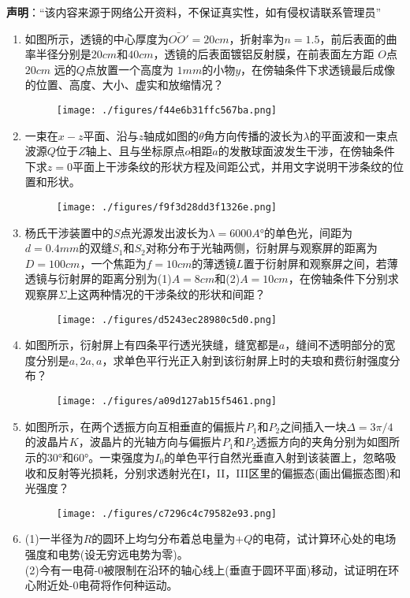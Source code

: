 

\textbf{声明}：“该内容来源于网络公开资料，不保证真实性，如有侵权请联系管理员”
\begin{enumerate}
\item 如图所示，透镜的中心厚度为$\bar{OO'}=20cm$，折射率为$n=1.5$，前后表面的曲率半径分别是$20cm$和$40cm$，透镜的后表面镀铝反射膜，在前表面左方距 $O$点 $20cm$ 远的$Q$点放置一个高度为 $1mm $的小物$y$，在傍轴条件下求透镜最后成像的位置、高度、大小、虚实和放缩情况？
\begin{figure}[ht]
\centering
\texttt{[image: ./figures/f44e6b31ffc567ba.png]}
\caption{} \label{fig_HGD04_2}
\end{figure}
\item 一束在$x-z$平面、沿与$z$轴成如图的$\theta$角方向传播的波长为$\lambda$的平面波和一束点波源$Q$位于$Z$轴上、且与坐标原点$o$相距$a$的发散球面波发生干涉，在傍轴条件下求$z=0$平面上干涉条纹的形状方程及间距公式，并用文字说明干涉条纹的位置和形状。
\begin{figure}[ht]
\centering
\texttt{[image: ./figures/f9f3d28dd3f1326e.png]}
\caption{} \label{fig_HGD04_1}
\end{figure}
\item 杨氏干涉装置中的$S$点光源发出波长为$\lambda=6000A$°的单色光，间距为$d=0.4mm$的双缝$S_1$和$S_2$对称分布于光轴两侧，衍射屏与观察屏的距离为$D=100cm$，一个焦距为$f=10cm$的薄透镜$L$置于衍射屏和观察屏之间，若薄透镜与衍射屏的距离分别为(1)$A=8cm$和(2)$A=10cm$，在傍轴条件下分别求观察屏$\Sigma$上这两种情况的干涉条纹的形状和间距？
\begin{figure}[ht]
\centering
\texttt{[image: ./figures/d5243ec28980c5d0.png]}
\caption{} \label{fig_HGD04_3}
\end{figure}
\item 如图所示，衍射屏上有四条平行透光狭缝，缝宽都是$a$，缝间不透明部分的宽度分别是$a,2a,a$，求单色平行光正入射到该衍射屏上时的夫琅和费衍射强度分布？
\begin{figure}[ht]
\centering
\texttt{[image: ./figures/a09d127ab15f5461.png]}
\caption{} \label{fig_HGD04_4}
\end{figure}
\item 如图所示，在两个透振方向互相垂直的偏振片$P_1$和$P_2$之间插入一块$\Delta=3\pi/4$的波晶片$K$，波晶片的光轴方向与偏振片$P_1$和$P_2$透振方向的夹角分别为如图所示的$30$°和$60$°。一束强度为$I_0$的单色平行自然光垂直入射到该装置上，忽略吸收和反射等光损耗，分别求透射光在I，II，III区里的偏振态(画出偏振态图)和光强度？
\begin{figure}[ht]
\centering
\texttt{[image: ./figures/c7296c4c79582e93.png]}
\caption{} \label{fig_HGD04_5}
\end{figure}
\item (1)一半径为$R$的圆环上均匀分布着总电量为$+Q$的电荷，试计算环心处的电场强度和电势(设无穷远电势为零)。\\
(2)今有一电荷-0被限制在沿环的轴心线上(垂直于圆环平面)移动，试证明在环心附近处-0电荷将作何种运动。
\end{enumerate}